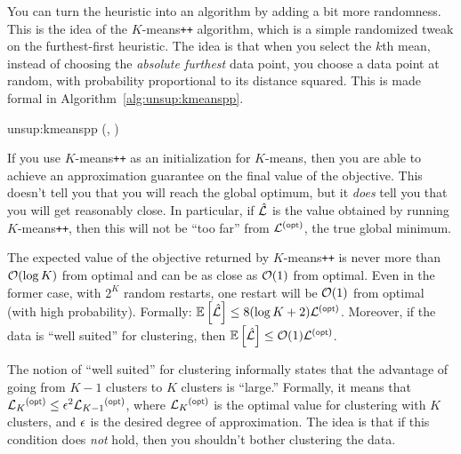 You can turn the heuristic into an algorithm by adding a bit more
randomness.  This is the idea of the $K$-means{\tt ++} algorithm,
which is a simple randomized tweak on the furthest-first heuristic.
The idea is that when you select the $k$th mean, instead of choosing
the \emph{absolute furthest} data point, you choose a data point at
random, with probability proportional to its distance squared.  This
is made formal in Algorithm~\ref{alg:unsup:kmeanspp}.

\newalgorithm%
  {unsup:kmeanspp}%
  {(, )}
  {
\ENDFOR
{}
}

If you use $K$-means{\tt ++} as an initialization for $K$-means, then
you are able to achieve an approximation guarantee on the final value
of the objective.  This doesn't tell you that you will reach the
global optimum, but it \emph{does} tell you that you will get
reasonably close.  In particular, if $\hat{\mathcal{L}}$ is the value obtained
by running $K$-means{\tt ++}, then this will not be ``too far'' from
$\cL\xth{opt}$, the true global minimum.
%
\begin{theorem} \label{thm:unsup:kmeanspp} The expected value of the
  objective returned by $K$-means{\tt ++} is never more than $\mathcal{O}(\log
  K)$ from optimal and can be as close as $\mathcal{O}(1)$ from optimal.  Even
  in the former case, with $2^K$ random restarts, one restart will be
  $\mathcal{O}(1)$ from optimal (with high probability).  Formally: $\Ep\left[
    \hat \cL \right] \leq 8 (\log K + 2) \cL\xth{opt}$.  Moreover, if
  the data is ``well suited'' for clustering, then $\Ep\left[ \hat \cL
  \right] \leq \cO(1) \cL\xth{opt}$.
\end{theorem}
%
The notion of ``well suited'' for clustering informally states that
the advantage of going from $K-1$ clusters to $K$ clusters is
``large.''  Formally, it means that $\cL_K\xth{opt} \leq \ep^2
\cL_{K-1}\xth{opt}$, where $\cL_K\xth{opt}$ is the optimal value for
clustering with $K$ clusters, and $\epsilon$ is the desired degree of
approximation.  The idea is that if this condition does \emph{not}
hold, then you shouldn't bother clustering the data.

